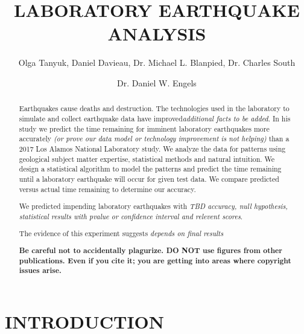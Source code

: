 \documentclass[]{llncs}
\begin{document}

\title{LABORATORY EARTHQUAKE ANALYSIS}

\author{Olga Tanyuk, Daniel Davieau, Dr. Michael L. Blanpied, Dr. Charles South \and Dr. Daniel W. Engels}



\maketitle

\begin{abstract}
Earthquakes cause deaths and destruction.  The technologies used in the laboratory to simulate and collect earthquake data have improved{\em additional facts to be added}. In his study we predict the time remaining for imminent laboratory earthquakes more accurately {\em (or prove our data model or technology improvement is not helping)} than a 2017 Los Alamos National Laboratory study\cite{Bertrand}.  We analyze the data for patterns using geological subject matter expertise, statistical methods and natural intuition. We design a statistical algorithm to model the patterns and predict the time remaining until a laboratory earthquake will occur for given test data. We compare predicted versus actual time remaining to determine our accuracy.

We predicted impending laboratory earthquakes with {\em TBD accuracy, null hypothesis, statistical results with pvalue or confidence interval and relevent scores}.

The evidence of this experiment suggests {\em depends on final results}



{\bf Be careful not to accidentally plagurize. DO NOT use figures from other publications. Even if you cite it; you are getting into areas where copyright issues arise.}

\end{abstract}
\section{INTRODUCTION}
\end{document}
